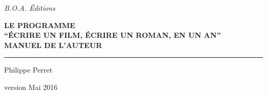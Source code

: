 
\begin{titlepage}
	\begin{center}\LARGE
		\textit{B.O.A. Éditions}
	\end{center}
	\selectfont

	\begin{flushleft}\huge\bfseries
    LE PROGRAMME \\
    \enquote{ÉCRIRE UN FILM, ÉCRIRE UN ROMAN, EN UN AN} \\
		{\small MANUEL DE L'AUTEUR}
	\end{flushleft}

	\hrule

	\begin{flushright}
		Philippe Perret
	\end{flushright}

	\begin{flushleft}\itshape\small
	\end{flushleft}

	\begin{center}
    version Mai 2016
	\end{center}
\end{titlepage}

